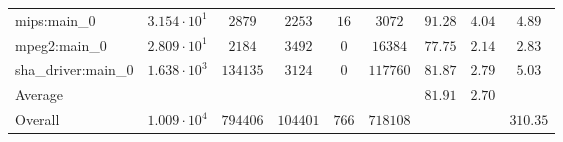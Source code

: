\begin{tabular}{|l|c|c|c|c|c|c|c|c|}
mips:main\_0            & $ 3.154 \cdot 10^{1} $ & $ 2879   $ & $ 2253   $ & $ 16  $ & $ 3072   $ & $ 91.28       $ & $ 4.04    $ & $ 4.89    $ \\
mpeg2:main\_0           & $ 2.809 \cdot 10^{1} $ & $ 2184   $ & $ 3492   $ & $ 0   $ & $ 16384  $ & $ 77.75       $ & $ 2.14    $ & $ 2.83    $ \\
sha\_driver:main\_0     & $ 1.638 \cdot 10^{3} $ & $ 134135 $ & $ 3124   $ & $ 0   $ & $ 117760 $ & $ 81.87       $ & $ 2.79    $ & $ 5.03    $ \\
\hline
Average                 & $                    $ & $        $ & $        $ & $     $ & $        $ & $ 81.91       $ & $ 2.70    $ & $         $ \\
\hline
Overall                 & $ 1.009 \cdot 10^{4} $ & $ 794406 $ & $ 104401 $ & $ 766 $ & $ 718108 $ & $             $ & $         $ & $ 310.35  $ \\
\hline
\end{tabular}
